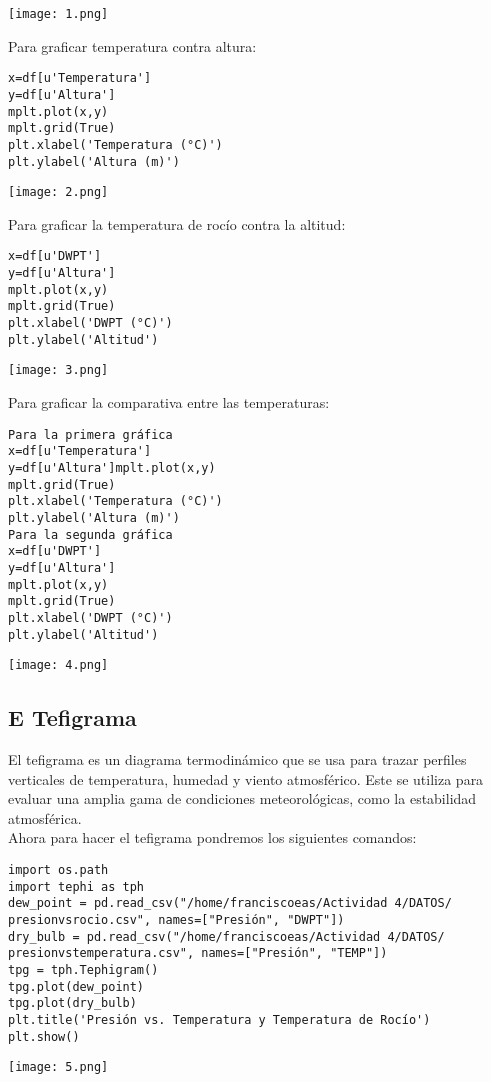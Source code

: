 \documentclass[12pt]{article}
\begin{document}
\begin{center}
\texttt{[image: 1.png]}

Para graficar temperatura contra altura:
\begin{verbatim}
x=df[u'Temperatura'] 
y=df[u'Altura']
mplt.plot(x,y)
mplt.grid(True)
plt.xlabel('Temperatura (°C)')
plt.ylabel('Altura (m)')
\end{verbatim}
\texttt{[image: 2.png]}
\vspace{0.5cm}

\newpage
Para graficar la temperatura de rocío contra la altitud:
\begin{verbatim}
x=df[u'DWPT']
y=df[u'Altura']
mplt.plot(x,y)
mplt.grid(True)
plt.xlabel('DWPT (°C)')
plt.ylabel('Altitud')
\end{verbatim}
\texttt{[image: 3.png]}

\newpage
Para graficar la comparativa entre las temperaturas:
\begin{verbatim}
Para la primera gráfica
x=df[u'Temperatura']
y=df[u'Altura']mplt.plot(x,y)
mplt.grid(True)
plt.xlabel('Temperatura (°C)')
plt.ylabel('Altura (m)')
Para la segunda gráfica
x=df[u'DWPT']
y=df[u'Altura']
mplt.plot(x,y)
mplt.grid(True)
plt.xlabel('DWPT (°C)')
plt.ylabel('Altitud')
\end{verbatim}
\texttt{[image: 4.png]}
\end{center}
\subsection{E Tefigrama}
El tefigrama es un diagrama termodinámico que se usa para trazar perfiles verticales de temperatura, humedad y viento atmosférico. Este se utiliza para evaluar una amplia gama de condiciones meteorológicas, como la estabilidad atmosférica. \\
Ahora para hacer el tefigrama pondremos los siguientes comandos:
\begin{center}
\begin{verbatim}
import os.path
import tephi as tph
dew_point = pd.read_csv("/home/franciscoeas/Actividad 4/DATOS/
presionvsrocio.csv", names=["Presión", "DWPT"])
dry_bulb = pd.read_csv("/home/franciscoeas/Actividad 4/DATOS/
presionvstemperatura.csv", names=["Presión", "TEMP"])
tpg = tph.Tephigram()
tpg.plot(dew_point)
tpg.plot(dry_bulb)
plt.title('Presión vs. Temperatura y Temperatura de Rocío')
plt.show()
\end{verbatim}
\texttt{[image: 5.png]}
\end{center}
\end{document}
